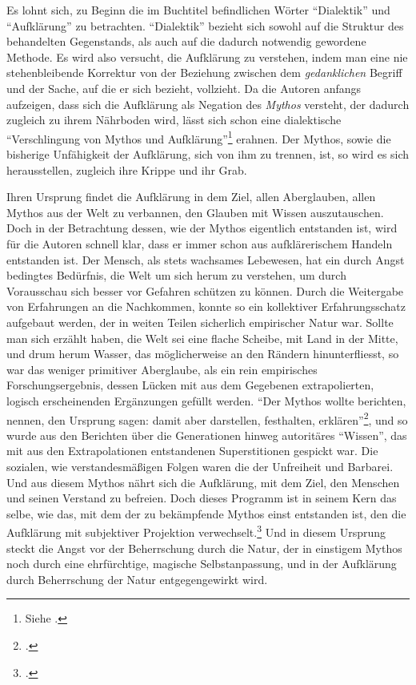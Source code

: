 \documentclass[a4paper, 12pt]{article}
\begin{document}
\begin{onehalfspace}
Es lohnt sich, zu Beginn die im Buchtitel befindlichen Wörter "`Dialektik"' und "`Aufklärung"' zu betrachten. "`Dialektik"' bezieht sich sowohl auf die Struktur des behandelten Gegenstands, als auch auf die dadurch notwendig gewordene Methode. Es wird also versucht, die Aufklärung zu verstehen, indem man eine nie stehenbleibende Korrektur von der Beziehung zwischen dem \emph{gedanklichen} Begriff und der Sache, auf die er sich bezieht, vollzieht.  Da die Autoren anfangs aufzeigen, dass sich die Aufklärung als Negation des \emph{Mythos} versteht, der dadurch zugleich zu ihrem Nährboden wird, lässt sich schon eine dialektische "`Verschlingung von Mythos und Aufklärung"'\footnote{Siehe \Cite{habermas}.} erahnen. Der Mythos, sowie die bisherige Unfähigkeit der Aufklärung, sich von ihm zu trennen, ist, so wird es sich herausstellen, zugleich ihre Krippe und ihr Grab.

Ihren Ursprung findet die Aufklärung in dem Ziel, allen Aberglauben, allen Mythos aus der Welt zu verbannen, den Glauben mit Wissen auszutauschen. Doch in der Betrachtung dessen, wie der Mythos eigentlich entstanden ist, wird für die Autoren schnell klar, dass er immer schon aus aufklärerischem Handeln entstanden ist. Der Mensch, als stets wachsames Lebewesen, hat ein durch Angst bedingtes Bedürfnis, die Welt um sich herum zu verstehen, um durch Vorausschau sich besser vor Gefahren schützen zu können. Durch die Weitergabe von Erfahrungen an die Nachkommen, konnte so ein kollektiver Erfahrungsschatz aufgebaut werden, der in weiten Teilen sicherlich empirischer Natur war. Sollte man sich erzählt haben, die Welt sei eine flache Scheibe, mit Land in der Mitte, und drum herum Wasser, das möglicherweise an den Rändern hinunterfliesst, so war das weniger primitiver Aberglaube, als ein rein empirisches Forschungsergebnis, dessen Lücken mit aus dem Gegebenen extrapolierten, logisch erscheinenden Ergänzungen gefüllt werden. "`Der Mythos wollte berichten, nennen, den Ursprung sagen: damit aber darstellen, festhalten, erklären"'\footnote{\Cite[Siehe][S. 14]{dialektik-der-aufklaerung}.}, und so wurde aus den Berichten über die Generationen hinweg autoritäres "`Wissen"', das mit aus den Extrapolationen entstandenen Superstitionen gespickt war. Die sozialen, wie verstandesmäßigen Folgen waren die der Unfreiheit und Barbarei. Und aus diesem Mythos nährt sich die Aufklärung, mit dem Ziel, den Menschen und seinen Verstand zu befreien. Doch dieses Programm ist in seinem Kern das selbe, wie das, mit dem der zu bekämpfende Mythos einst entstanden ist, den die Aufklärung mit subjektiver Projektion verwechselt.\footnote{\Cite[Vgl.][S. 12]{dialektik-der-aufklaerung}.} Und in diesem Ursprung steckt die Angst vor der Beherrschung durch die Natur, der in einstigem Mythos noch durch eine ehrfürchtige, magische Selbstanpassung, und in der Aufklärung durch Beherrschung der Natur entgegengewirkt wird. 



\end{onehalfspace}
\end{document}
